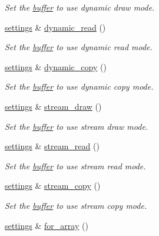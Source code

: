 \begin{DoxyCompactItemize}
\begin{DoxyCompactList}\small\item\em Set the \hyperlink{classgfx_1_1buffer}{buffer} to use dynamic draw mode. \end{DoxyCompactList}\item 
\hyperlink{classgfx_1_1buffer_1_1settings}{settings} \& \hyperlink{classgfx_1_1buffer_1_1settings_ab02434d6721200be8f49a312fa3261dc}{dynamic\-\_\-read} ()
\begin{DoxyCompactList}\small\item\em Set the \hyperlink{classgfx_1_1buffer}{buffer} to use dynamic read mode. \end{DoxyCompactList}\item 
\hyperlink{classgfx_1_1buffer_1_1settings}{settings} \& \hyperlink{classgfx_1_1buffer_1_1settings_a31bdaa1e81b9caa8c9dfc46801d9db25}{dynamic\-\_\-copy} ()
\begin{DoxyCompactList}\small\item\em Set the \hyperlink{classgfx_1_1buffer}{buffer} to use dynamic copy mode. \end{DoxyCompactList}\item 
\hyperlink{classgfx_1_1buffer_1_1settings}{settings} \& \hyperlink{classgfx_1_1buffer_1_1settings_a1dacd26f7e37224295797e70dd386160}{stream\-\_\-draw} ()
\begin{DoxyCompactList}\small\item\em Set the \hyperlink{classgfx_1_1buffer}{buffer} to use stream draw mode. \end{DoxyCompactList}\item 
\hyperlink{classgfx_1_1buffer_1_1settings}{settings} \& \hyperlink{classgfx_1_1buffer_1_1settings_a9413162ad48463cb21adc32708687791}{stream\-\_\-read} ()
\begin{DoxyCompactList}\small\item\em Set the \hyperlink{classgfx_1_1buffer}{buffer} to use stream read mode. \end{DoxyCompactList}\item 
\hyperlink{classgfx_1_1buffer_1_1settings}{settings} \& \hyperlink{classgfx_1_1buffer_1_1settings_a72719cb14cf40804d4227a903bfae80a}{stream\-\_\-copy} ()
\begin{DoxyCompactList}\small\item\em Set the \hyperlink{classgfx_1_1buffer}{buffer} to use stream copy mode. \end{DoxyCompactList}\item 
\hyperlink{classgfx_1_1buffer_1_1settings}{settings} \& \hyperlink{classgfx_1_1buffer_1_1settings_a0e30752bc2e675f46a203bd27eed0de2}{for\-\_\-array} ()

\end{DoxyCompactItemize}
